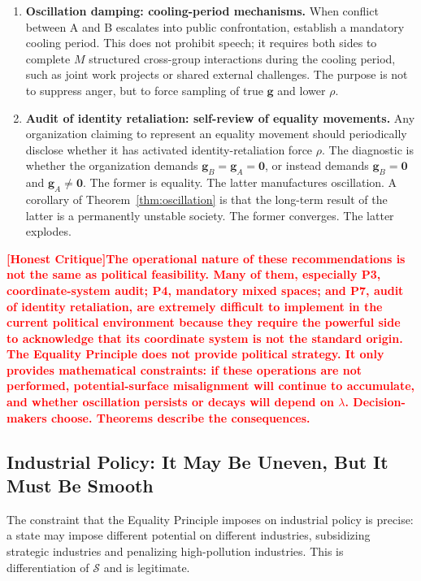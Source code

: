 \documentclass[12pt,a4paper]{article}
\theoremstyle{remark}
\newcommand{\honestcrit}[1]{%
    \textcolor{red}{\textbf{[Honest Critique]#1}}%
}
\begin{document}
\begin{enumerate}[label=\textbf{P\arabic*}]
    \item \textbf{Oscillation damping: cooling-period mechanisms.} When conflict between A and B escalates into public confrontation, establish a mandatory cooling period. This does not prohibit speech; it requires both sides to complete $M$ structured cross-group interactions during the cooling period, such as joint work projects or shared external challenges. The purpose is not to suppress anger, but to force sampling of true $\mathbf{g}$ and lower $\rho$.
    
    \item \textbf{Audit of identity retaliation: self-review of equality movements.} Any organization claiming to represent an equality movement should periodically disclose whether it has activated identity-retaliation force $\rho$. The diagnostic is whether the organization demands $\mathbf{g}_B = \mathbf{g}_A = \mathbf{0}$, or instead demands $\mathbf{g}_B = \mathbf{0}$ and $\mathbf{g}_A \neq \mathbf{0}$. The former is equality. The latter manufactures oscillation. A corollary of Theorem~\ref{thm:oscillation} is that the long-term result of the latter is a permanently unstable society. The former converges. The latter explodes.
\end{enumerate}

\honestcrit{The operational nature of these recommendations is not the same as political feasibility. Many of them, especially P3, coordinate-system audit; P4, mandatory mixed spaces; and P7, audit of identity retaliation, are extremely difficult to implement in the current political environment because they require the powerful side to acknowledge that its coordinate system is not the standard origin. The Equality Principle does not provide political strategy. It only provides mathematical constraints: if these operations are not performed, potential-surface misalignment will continue to accumulate, and whether oscillation persists or decays will depend on $\lambda$. Decision-makers choose. Theorems describe the consequences.}

\subsection{Industrial Policy: It May Be Uneven, But It Must Be Smooth}

The constraint that the Equality Principle imposes on industrial policy is precise: a state may impose different potential on different industries, subsidizing strategic industries and penalizing high-pollution industries. This is differentiation of $\mathcal{S}$ and is legitimate.
\end{document}
